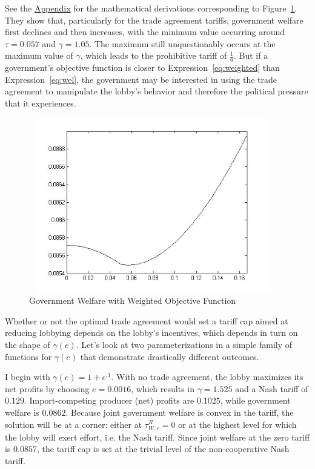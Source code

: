 \documentclass[12pt]{article}
\newcommand{\ga}{\gamma}
\begin{document}
See the \hyperlink{sol_weighted}{Appendix} for the mathematical derivations corresponding to Figure~\ref{fig:weight}. They show that, particularly for the trade agreement tariffs, government welfare first declines and then increases, with the minimum value occurring around $\tau = 0.057$ and $\ga = 1.05$. The maximum still unquestionably occurs at the maximum value of $\ga$, which leads to the prohibitive tariff of $\frac{1}{6}$. But if a government's objective function is closer to Expression~\ref{eq:weighted} than Expression~\ref{eq:wel}, the government may be interested in using the trade agreement to manipulate the lobby's behavior and therefore the political pressure that it experiences.
	
\begin{figure}
\begin{center}
\includegraphics[height=3in, width=4.25in]{weight.jpg}
\end{center}
\caption{Government Welfare with Weighted Objective Function \label{fig:weight}}
\end{figure}

Whether or not the optimal trade agreement would set a tariff cap aimed at reducing lobbying depends on the lobby's incentives, which depends in turn on the shape of $\ga(e)$. Let's look at two parameterizations in a simple family of functions for $\ga(e)$ that demonstrate drastically different outcomes.

I begin with $\ga(e) = 1 + e^{.1}$. With no trade agreement, the lobby maximizes its net profits by choosing $e=0.0016$, which results in $\ga=1.525$ and a Nash tariff of $0.129$. Import-competing producer (net) profits are $0.1025$, while government welfare is $0.0862$. Because joint government welfare is convex in the tariff, the solution will be at a corner: either at $\tau^R_{W,e} =0$ or at the highest level for which the lobby will exert effort, i.e. the Nash tariff. Since joint welfare at the zero tariff is $0.0857$, the tariff cap is set at the trivial level of the non-cooperative Nash tariff. 
\end{document}
